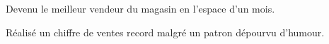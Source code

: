 \begin{achievements}
	\item Devenu le meilleur vendeur du magasin en l’espace d’un mois.
	\item Réalisé un chiffre de ventes record malgré un patron dépourvu d’humour.
\end{achievements}
